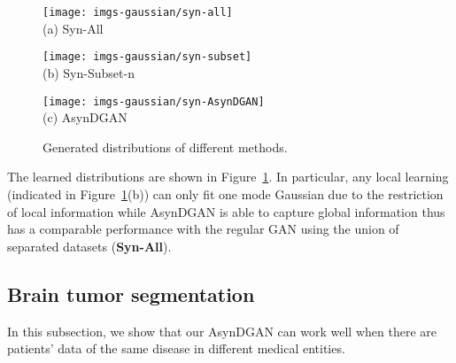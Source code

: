 


\begin{figure}
\centering
\begin{minipage}{0.325\linewidth}
	\centering\texttt{[image: imgs-gaussian/syn-all]} \\ (a) Syn-All
\end{minipage}
\begin{minipage}{0.325\linewidth}
\centering\texttt{[image: imgs-gaussian/syn-subset]} \\ (b) Syn-Subset-n
\end{minipage}
\begin{minipage}{0.325\linewidth}
\centering\texttt{[image: imgs-gaussian/syn-AsynDGAN]} \\ (c) AsynDGAN
\end{minipage}
\caption{Generated distributions of different methods.}
\label{fig:gaussian}
\vspace{-1em}
\end{figure}

The learned distributions are shown in Figure~\ref{fig:gaussian}. In particular, any local learning (indicated in Figure~\ref{fig:gaussian}(b)) can only fit one mode Gaussian due to the restriction of local information while AsynDGAN is able to capture global information thus has a comparable performance with the regular GAN using the union of separated datasets (\textbf{Syn-All}).

\subsection{Brain tumor segmentation}\label{sec:exp:hgg}
In this subsection, we show that our AsynDGAN can work well when there are patients' data of the same disease in different medical entities.
